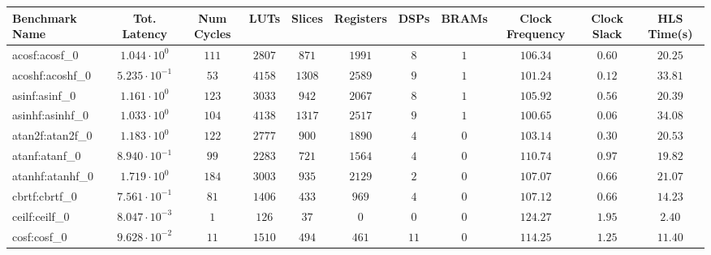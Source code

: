 \begin{tabular}{|l|c|c|c|c|c|c|c|c|c|c|}
\hline
Benchmark Name               & Tot. Latency            & Num Cycles & LUTs      & Slices    & Registers & DSPs    & BRAMs & Clock Frequency & Clock Slack & HLS Time(s) \\
\hline
acosf:acosf\_0               & $ 1.044 \cdot 10^{0}  $ & $ 111    $ & $ 2807  $ & $ 871   $ & $ 1991  $ & $ 8   $ & $ 1 $ & $ 106.34      $ & $ 0.60    $ & $ 20.25   $ \\
acoshf:acoshf\_0             & $ 5.235 \cdot 10^{-1} $ & $ 53     $ & $ 4158  $ & $ 1308  $ & $ 2589  $ & $ 9   $ & $ 1 $ & $ 101.24      $ & $ 0.12    $ & $ 33.81   $ \\
asinf:asinf\_0               & $ 1.161 \cdot 10^{0}  $ & $ 123    $ & $ 3033  $ & $ 942   $ & $ 2067  $ & $ 8   $ & $ 1 $ & $ 105.92      $ & $ 0.56    $ & $ 20.39   $ \\
asinhf:asinhf\_0             & $ 1.033 \cdot 10^{0}  $ & $ 104    $ & $ 4138  $ & $ 1317  $ & $ 2517  $ & $ 9   $ & $ 1 $ & $ 100.65      $ & $ 0.06    $ & $ 34.08   $ \\
atan2f:atan2f\_0             & $ 1.183 \cdot 10^{0}  $ & $ 122    $ & $ 2777  $ & $ 900   $ & $ 1890  $ & $ 4   $ & $ 0 $ & $ 103.14      $ & $ 0.30    $ & $ 20.53   $ \\
atanf:atanf\_0               & $ 8.940 \cdot 10^{-1} $ & $ 99     $ & $ 2283  $ & $ 721   $ & $ 1564  $ & $ 4   $ & $ 0 $ & $ 110.74      $ & $ 0.97    $ & $ 19.82   $ \\
atanhf:atanhf\_0             & $ 1.719 \cdot 10^{0}  $ & $ 184    $ & $ 3003  $ & $ 935   $ & $ 2129  $ & $ 2   $ & $ 0 $ & $ 107.07      $ & $ 0.66    $ & $ 21.07   $ \\
cbrtf:cbrtf\_0               & $ 7.561 \cdot 10^{-1} $ & $ 81     $ & $ 1406  $ & $ 433   $ & $ 969   $ & $ 4   $ & $ 0 $ & $ 107.12      $ & $ 0.66    $ & $ 14.23   $ \\
ceilf:ceilf\_0               & $ 8.047 \cdot 10^{-3} $ & $ 1      $ & $ 126   $ & $ 37    $ & $ 0     $ & $ 0   $ & $ 0 $ & $ 124.27      $ & $ 1.95    $ & $ 2.40    $ \\
cosf:cosf\_0                 & $ 9.628 \cdot 10^{-2} $ & $ 11     $ & $ 1510  $ & $ 494   $ & $ 461   $ & $ 11  $ & $ 0 $ & $ 114.25      $ & $ 1.25    $ & $ 11.40   $ \\

\end{tabular}
